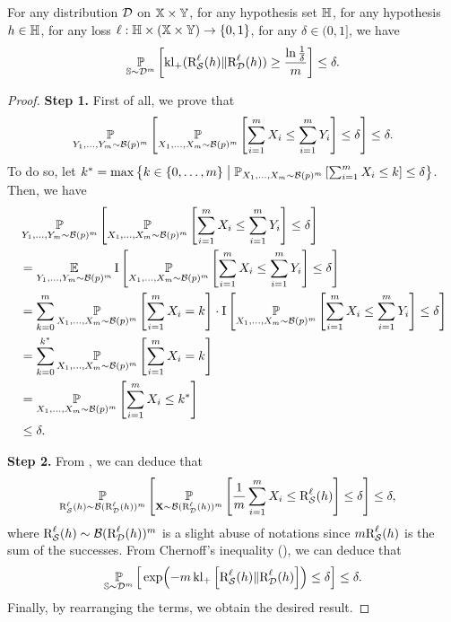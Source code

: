 \begin{noaddcontents}
\begin{lemma} For any distribution $\mathcal{D}$ on $\mathbb{X}\times\mathbb{Y}$, for any hypothesis set $\mathbb{H}$, for any hypothesis $h\in\mathbb{H}$, for any loss $\ell: \mathbb{H}\times(\mathbb{X}\times\mathbb{Y})\to \{0,1\}$, for any $\delta\in(0, 1]$, we have
\begin{align*}
\operatorname*{\mathbb{P}}_{\mathbb{S}\sim\mathcal{D}^m}\left[ \operatorname{kl}_{+}(\text{R}^{\ell}_{\mathcal{S}}(h)\|\text{R}^{\ell}_{\mathcal{D}}(h)) \ge \frac{\ln\frac{1}{\delta}}{m} \right] \le \delta.
\end{align*}
\label{ap:pac-bayes:lemma:kl-langford}
\end{lemma}
\begin{proof}
\textbf{Step 1.} First of all, we prove that 
\begin{align}
\operatorname*{\mathbb{P}}_{Y_1,\dots,Y_m \sim \mathcal{B}(p)^m}\left[ \operatorname*{\mathbb{P}}_{X_1,\dots,X_m \sim \mathcal{B}(p)^m}\left[\sum_{i=1}^{m}X_i \le \sum_{i=1}^{m}Y_i\right] \le \delta \right] \le \delta.\label{ap:pac-bayes:eq:proof-kl-langford-1}
\end{align}
To do so, let $k^*=\max\left\{ k\in\{0,\dots, m\} \;\middle|\; \operatorname*{\mathbb{P}}_{X_1,\dots,X_m \sim \mathcal{B}(p)^m}\left[\sum_{i=1}^{m}X_i \le k\right] \le \delta \right\}$. 
Then, we have
\begingroup
\allowdisplaybreaks
\begin{align*}
    &\operatorname*{\mathbb{P}}_{Y_1,\dots,Y_m \sim \mathcal{B}(p)^m}\left[ \operatorname*{\mathbb{P}}_{X_1,\dots,X_m \sim \mathcal{B}(p)^m}\left[\sum_{i=1}^{m}X_i \le \sum_{i=1}^{m}Y_i\right] \le \delta \right]\\
    &= \operatorname*{\mathbb{E}}_{Y_1,\dots,Y_m \sim \mathcal{B}(p)^m}\operatorname{I}\left[ \operatorname*{\mathbb{P}}_{X_1,\dots,X_m \sim \mathcal{B}(p)^m}\left[\sum_{i=1}^{m}X_i \le \sum_{i=1}^{m}Y_i\right] \le \delta \right]\\
    &= \sum_{k=0}^{m} \operatorname*{\mathbb{P}}_{X_1,\dots,X_m \sim \mathcal{B}(p)^m}\left[ \sum_{i=1}^{m}X_i = k\right]\cdot\operatorname{I}\left[ \operatorname*{\mathbb{P}}_{X_1,\dots,X_m \sim \mathcal{B}(p)^m}\left[\sum_{i=1}^{m}X_i \le \sum_{i=1}^{m}Y_i\right] \le \delta \right]\\
    &= \sum_{k=0}^{k^*} \operatorname*{\mathbb{P}}_{X_1,\dots,X_m \sim \mathcal{B}(p)^m}\left[ \sum_{i=1}^{m}X_i = k\right]\\
    &= \operatorname*{\mathbb{P}}_{X_1,\dots,X_m \sim \mathcal{B}(p)^m}\left[ \sum_{i=1}^{m}X_i \le k^*\right]\\
    &\le \delta.
\end{align*}
\endgroup

\textbf{Step 2.} From , we can deduce that
\begin{align*}
 &\operatorname*{\mathbb{P}}_{\text{R}^{\ell}_{\mathcal{S}}(h)\sim\mathcal{B}(\text{R}^{\ell}_{\mathcal{D}}(h))^m}\left[ \operatorname*{\mathbb{P}}_{\mathbf{X}\sim\mathcal{B}(\text{R}^{\ell}_{\mathcal{D}}(h))^m}\left[ \frac{1}{m}\sum_{i=1}^{m}X_i \le \text{R}^{\ell}_{\mathcal{S}}(h) \right] \le \delta \right] \le \delta,
 \end{align*}
where $\text{R}^{\ell}_{\mathcal{S}}(h)\sim\mathcal{B}(\text{R}^{\ell}_{\mathcal{D}}(h))^m$ is a slight abuse of notations since $m\text{R}^{\ell}_{\mathcal{S}}(h)$ is the sum of the successes.
From Chernoff's inequality (), we can deduce that 
\begin{align*}
    \operatorname*{\mathbb{P}}_{\mathbb{S}\sim\mathcal{D}^m}\Big[ \exp\!\left(-m\operatorname{kl}_{+}\left[\text{R}^{\ell}_{\mathcal{S}}(h)\|\text{R}^{\ell}_{\mathcal{D}}(h)\right]\right) \le \delta \Big] \le \delta.
\end{align*}
Finally, by rearranging the terms, we obtain the desired result.
\end{proof}


\end{noaddcontents}

